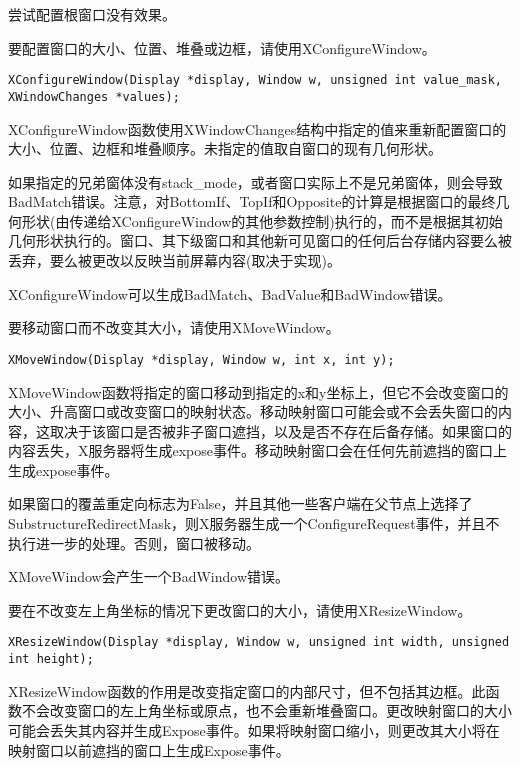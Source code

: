 尝试配置根窗口没有效果。

要配置窗口的大小、位置、堆叠或边框，请使用XConfigureWindow。

\begin{lstlisting}
XConfigureWindow(Display *display, Window w, unsigned int value_mask, XWindowChanges *values);
\end{lstlisting}

XConfigureWindow函数使用XWindowChanges结构中指定的值来重新配置窗口的大小、位置、边框和堆叠顺序。未指定的值取自窗口的现有几何形状。

如果指定的兄弟窗体没有stack\_mode，或者窗口实际上不是兄弟窗体，则会导致BadMatch错误。注意，对BottomIf、TopIf和Opposite的计算是根据窗口的最终几何形状(由传递给XConfigureWindow的其他参数控制)执行的，而不是根据其初始几何形状执行的。窗口、其下级窗口和其他新可见窗口的任何后台存储内容要么被丢弃，要么被更改以反映当前屏幕内容(取决于实现)。

XConfigureWindow可以生成BadMatch、BadValue和BadWindow错误。

\noindent 要移动窗口而不改变其大小，请使用XMoveWindow。

\begin{lstlisting}
XMoveWindow(Display *display, Window w, int x, int y);
\end{lstlisting}

XMoveWindow函数将指定的窗口移动到指定的x和y坐标上，但它不会改变窗口的大小、升高窗口或改变窗口的映射状态。移动映射窗口可能会或不会丢失窗口的内容，这取决于该窗口是否被非子窗口遮挡，以及是否不存在后备存储。如果窗口的内容丢失，X服务器将生成expose事件。移动映射窗口会在任何先前遮挡的窗口上生成expose事件。

如果窗口的覆盖重定向标志为False，并且其他一些客户端在父节点上选择了SubstructureRedirectMask，则X服务器生成一个ConfigureRequest事件，并且不执行进一步的处理。否则，窗口被移动。

\noindent XMoveWindow会产生一个BadWindow错误。

\noindent 要在不改变左上角坐标的情况下更改窗口的大小，请使用XResizeWindow。

\begin{lstlisting}
XResizeWindow(Display *display, Window w, unsigned int width, unsigned int height);
\end{lstlisting}

XResizeWindow函数的作用是改变指定窗口的内部尺寸，但不包括其边框。此函数不会改变窗口的左上角坐标或原点，也不会重新堆叠窗口。更改映射窗口的大小可能会丢失其内容并生成Expose事件。如果将映射窗口缩小，则更改其大小将在映射窗口以前遮挡的窗口上生成Expose事件。

